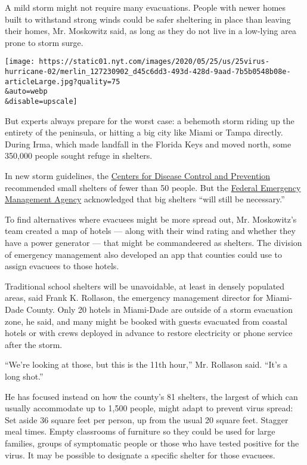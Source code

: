 A mild storm might not require many evacuations. People with newer homes
built to withstand strong winds could be safer sheltering in place than
leaving their homes, Mr. Moskowitz said, as long as they do not live in
a low-lying area prone to storm surge.

\texttt{[image: https://static01.nyt.com/images/2020/05/25/us/25virus-hurricane-02/merlin\_127230902\_d45c6dd3-493d-428d-9aad-7b5b0548b08e-articleLarge.jpg?quality=75\\\&auto=webp\\\&disable=upscale]}

But experts always prepare for the worst case: a behemoth storm riding
up the entirety of the peninsula, or hitting a big city like Miami or
Tampa directly. During Irma, which made landfall in the Florida Keys and
moved north, some 350,000 people sought refuge in shelters.

In new storm guidelines, the
\href{https://www.cdc.gov/coronavirus/2019-ncov/downloads/Guidance-for-Gen-Pop-Disaster-Shelters-a-Pandemic_cleared_JIC_ADS_final.pdf}{Centers
for Disease Control and Prevention} recommended small shelters of fewer
than 50 people. But the
\href{https://www.fema.gov/media-library-data/1589997234798-adb5ce5cb98a7a89e3e1800becf0eb65/2020_Hurricane_Pandemic_Plan.pdf}{Federal
Emergency Management Agency} acknowledged that big shelters ``will still
be necessary.''

To find alternatives where evacuees might be more spread out, Mr.
Moskowitz's team created a map of hotels --- along with their wind
rating and whether they have a power generator --- that might be
commandeered as shelters. The division of emergency management also
developed an app that counties could use to assign evacuees to those
hotels.

Traditional school shelters will be unavoidable, at least in densely
populated areas, said Frank K. Rollason, the emergency management
director for Miami-Dade County. Only 20 hotels in Miami-Dade are outside
of a storm evacuation zone, he said, and many might be booked with
guests evacuated from coastal hotels or with crews deployed in advance
to restore electricity or phone service after the storm.

``We're looking at those, but this is the 11th hour,'' Mr. Rollason
said. ``It's a long shot.''

He has focused instead on how the county's 81 shelters, the largest of
which can usually accommodate up to 1,500 people, might adapt to prevent
virus spread: Set aside 36 square feet per person, up from the usual 20
square feet. Stagger meal times. Empty classrooms of furniture so they
could be used for large families, groups of symptomatic people or those
who have tested positive for the virus. It may be possible to designate
a specific shelter for those evacuees.


